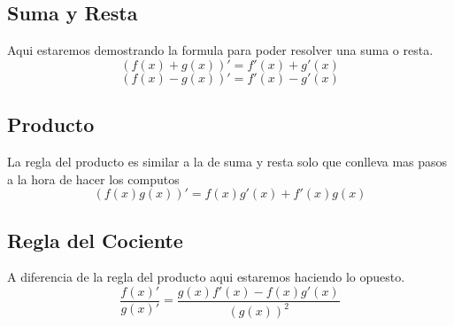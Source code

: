 \documentclass[a4paper,12pt]{article}
\begin{document}
\subsection{Suma y Resta}
Aqui estaremos demostrando la formula para poder resolver una suma o resta.
$$(f(x)+g(x))' = f'(x)+g'(x)$$
$$(f(x)-g(x))'= f'(x)-g'(x)$$
\subsection{Producto}
La regla del producto es similar a la de suma y resta solo que conlleva mas pasos a la hora de hacer los computos
$$(f(x)g(x))'=f(x)g'(x)+f'(x)g(x)$$
\subsection{Regla del Cociente}
A diferencia de la regla del producto aqui estaremos haciendo lo opuesto.
$$\frac{f(x)'}{g(x)'} = \frac{g(x)f'(x)-f(x)g'(x)}{(g(x))^2}$$
\end{document}

